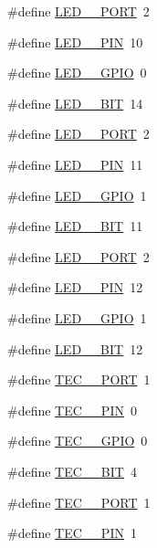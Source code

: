 \begin{DoxyCompactItemize}
\item 
\#define \hyperlink{group__hal_ga2367ab7af33710f8502250e8bd2c1dc0}{L\+E\+D\+\_\+\_\+\+P\+O\+RT}~2
\item 
\#define \hyperlink{group__hal_ga620741f492787e04779bab21e6658113}{L\+E\+D\+\_\+\_\+\+P\+IN}~10
\item 
\#define \hyperlink{group__hal_ga37154c806d85fb9f9158f86bb55e9ee0}{L\+E\+D\+\_\+\_\+\+G\+P\+IO}~0
\item 
\#define \hyperlink{group__hal_ga3fe9954e37c14ff0232f26822e5df035}{L\+E\+D\+\_\+\_\+\+B\+IT}~14
\item 
\#define \hyperlink{group__hal_ga41f8586c0d98e483bba52f73e1a183b2}{L\+E\+D\+\_\+\_\+\+P\+O\+RT}~2
\item 
\#define \hyperlink{group__hal_ga78579f743b58c20ec8d10120d8381148}{L\+E\+D\+\_\+\_\+\+P\+IN}~11
\item 
\#define \hyperlink{group__hal_ga4285bdd58098064c3bab3976a78b26fa}{L\+E\+D\+\_\+\_\+\+G\+P\+IO}~1
\item 
\#define \hyperlink{group__hal_gaef7b45a64de5055d117ed11ec76ee9f5}{L\+E\+D\+\_\+\_\+\+B\+IT}~11
\item 
\#define \hyperlink{group__hal_gaaa65a4a427142f3ecdc5f1fe415d190c}{L\+E\+D\+\_\+\_\+\+P\+O\+RT}~2
\item 
\#define \hyperlink{group__hal_ga5ea98da36d05b171b54c342bcf4a35f7}{L\+E\+D\+\_\+\_\+\+P\+IN}~12
\item 
\#define \hyperlink{group__hal_gadd2d323f8eb544f1ab84762f94e44bd4}{L\+E\+D\+\_\+\_\+\+G\+P\+IO}~1
\item 
\#define \hyperlink{group__hal_gab9b4d582a53ac2329ac4b7527561fa80}{L\+E\+D\+\_\+\_\+\+B\+IT}~12
\item 
\#define \hyperlink{group__hal_ga8646ae3b4a7ad2be7610ff81e3d73c0f}{T\+E\+C\+\_\+\_\+\+P\+O\+RT}~1
\item 
\#define \hyperlink{group__hal_gabbb083565fd13306450dfc5fdcf934c0}{T\+E\+C\+\_\+\_\+\+P\+IN}~0
\item 
\#define \hyperlink{group__hal_ga8731b2048404c4c819291bebfc6a1e6a}{T\+E\+C\+\_\+\_\+\+G\+P\+IO}~0
\item 
\#define \hyperlink{group__hal_ga0f27cf5eeffd9d5f04a6a4c57bbdbae7}{T\+E\+C\+\_\+\_\+\+B\+IT}~4
\item 
\#define \hyperlink{group__hal_ga6dd94a0728943a6bb0706bae78aa529f}{T\+E\+C\+\_\+\_\+\+P\+O\+RT}~1
\item 
\#define \hyperlink{group__hal_gae23ce57ac09e13a68a782d5bb61c8a30}{T\+E\+C\+\_\+\_\+\+P\+IN}~1

\end{DoxyCompactItemize}
